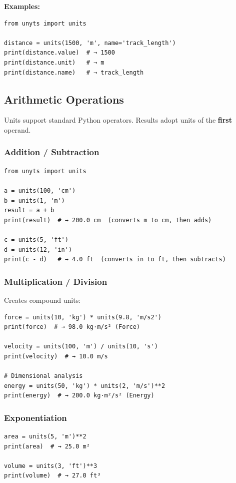 \documentclass[11pt,a4paper]{report}
\begin{document}
\textbf{Examples:}
\begin{lstlisting}[style=pythonstyle]
from unyts import units

distance = units(1500, 'm', name='track_length')
print(distance.value)  # → 1500
print(distance.unit)   # → m
print(distance.name)   # → track_length
\end{lstlisting}

\subsection{Arithmetic Operations}

Units support standard Python operators. Results adopt units of the \textbf{first} operand.

\subsubsection{Addition / Subtraction}

\begin{lstlisting}[style=pythonstyle]
from unyts import units

a = units(100, 'cm')
b = units(1, 'm')
result = a + b
print(result)  # → 200.0 cm  (converts m to cm, then adds)

c = units(5, 'ft')
d = units(12, 'in')
print(c - d)   # → 4.0 ft  (converts in to ft, then subtracts)
\end{lstlisting}

\subsubsection{Multiplication / Division}

Creates compound units:

\begin{lstlisting}[style=pythonstyle]
force = units(10, 'kg') * units(9.8, 'm/s2')
print(force)  # → 98.0 kg·m/s² (Force)

velocity = units(100, 'm') / units(10, 's')
print(velocity)  # → 10.0 m/s

# Dimensional analysis
energy = units(50, 'kg') * units(2, 'm/s')**2
print(energy)  # → 200.0 kg·m²/s² (Energy)
\end{lstlisting}

\subsubsection{Exponentiation}

\begin{lstlisting}[style=pythonstyle]
area = units(5, 'm')**2
print(area)  # → 25.0 m²

volume = units(3, 'ft')**3
print(volume)  # → 27.0 ft³
\end{lstlisting}
\end{document}
